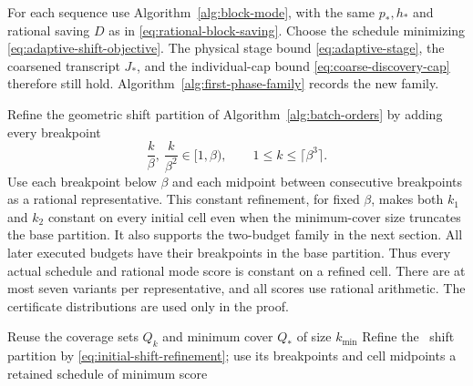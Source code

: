 For each sequence use Algorithm~\ref{alg:block-mode}, with the same
$p_*,h_*$ and rational saving $D$ as in
\eqref{eq:rational-block-saving}. Choose the schedule minimizing
\eqref{eq:adaptive-shift-objective}. The physical stage bound
\eqref{eq:adaptive-stage}, the coarsened transcript
$J_*$, and the individual-cap bound
\eqref{eq:coarse-discovery-cap} therefore still hold.
Algorithm~\ref{alg:first-phase-family} records the new family.

Refine the geometric shift partition of
Algorithm~\ref{alg:batch-orders} by adding every breakpoint
\begin{equation}\label{eq:initial-shift-refinement}
 \frac{k}{\beta},\ \frac{k}{\beta^2}\in[1,\beta),
 \qquad 1\le k\le\lceil\beta^3\rceil.
\end{equation}
Use each breakpoint below $\beta$ and each midpoint between
consecutive breakpoints as a rational representative. This constant
refinement, for fixed $\beta$, makes both $k_1$ and $k_2$ constant
on every initial cell even when the minimum-cover size truncates the
base partition. It also supports the two-budget family in the next
section. All later executed budgets have their breakpoints in the
base partition. Thus every actual schedule and rational mode score
is constant on a refined cell. There are at most seven variants per
representative, and all scores use rational arithmetic. The
certificate distributions are used only in the proof.

\begin{algorithm}[H]
\caption{Improved first-phase family for \ExpectedTree}
\label{alg:first-phase-family}
Reuse the coverage sets $Q_k$ and minimum cover $Q_*$ of size $k_{\min}$\;
Refine the \BatchOrders\ shift partition by
\eqref{eq:initial-shift-refinement}; use its breakpoints and cell midpoints\;
\KwRet a retained schedule of minimum score\;
\end{algorithm}


